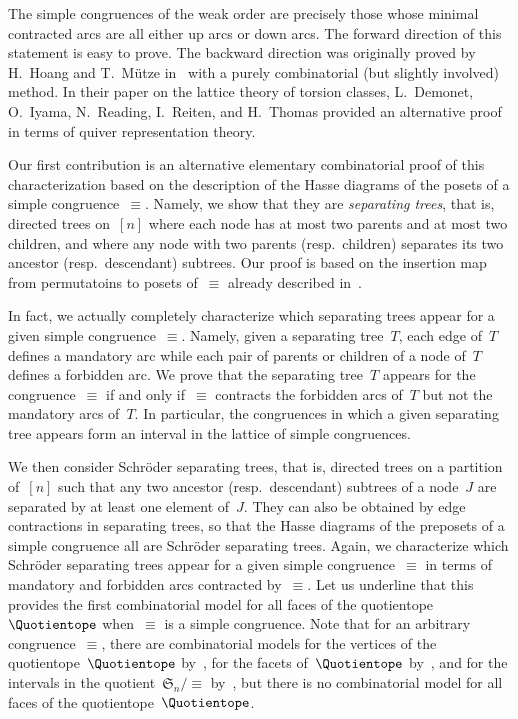 \documentclass{amsart}
\theoremstyle{definition}
\newcommand{\f}[1]{{\mathfrak{#1}}} %
\newcommand{\darkblue}{\color{darkblue}} %
\newcommand{\defn}[1]{\textsl{\darkblue #1}} %
\begin{document}
The simple congruences of the weak order are precisely those whose minimal contracted arcs are all either up arcs or down arcs.
The forward direction of this statement is easy to prove.
The backward direction was originally proved by H.~Hoang and T.~Mütze in~\cite[Sect.~4.4]{HoangMutze} with a purely combinatorial (but slightly involved) method.
In their paper on the lattice theory of torsion classes, L.~Demonet, O.~Iyama, N.~Reading, I.~Reiten, and H.~Thomas provided an alternative proof~\cite[Sect.~6.3]{DemonetIyamaReadingReitenThomas} in terms of quiver representation theory.

Our first contribution is an alternative elementary combinatorial proof of this characterization based on the description of the Hasse diagrams of the posets of a simple congruence~$\equiv$.
Namely, we show that they are \defn{separating trees}, that is, directed trees on~$[n]$ where each node has at most two parents and at most two children, and where any node with two parents (resp.~children) separates its two ancestor (resp.~descendant) subtrees.
Our proof is based on the insertion map from permutatoins to posets of~$\equiv$ already described in~\cite{Pilaud-arcDiagramAlgebra}.

In fact, we actually completely characterize which separating trees appear for a given simple congruence~$\equiv$.
Namely, given a separating tree~$T$, each edge of~$T$ defines a mandatory arc while each pair of parents or children of a node of~$T$ defines a forbidden arc.
We prove that the separating tree~$T$ appears for the congruence~$\equiv$ if and only if~$\equiv$ contracts the forbidden arcs of~$T$ but not the mandatory arcs of~$T$.
In particular, the congruences in which a given separating tree appears form an interval in the lattice of simple congruences.

We then consider Schröder separating trees, that is, directed trees on a partition of~$[n]$ such that any two ancestor (resp.~descendant) subtrees of a node~$J$ are separated by at least one element of~$J$. 
They can also be obtained by edge contractions in separating trees, so that the Hasse diagrams of the preposets of a simple congruence all are Schröder separating trees.
Again, we characterize which Schröder separating trees appear for a given simple congruence~$\equiv$ in terms of mandatory and forbidden arcs contracted by~$\equiv$.
Let us underline that this provides the first combinatorial model for all faces of the quotientope~$\Quotientope$ when~$\equiv$ is a simple congruence.
Note that for an arbitrary congruence~$\equiv$, there are combinatorial models for the vertices of the quotientope~$\Quotientope$ by~\cite{Reading-arcDiagrams}, for the facets of~$\Quotientope$ by~\cite{AlbertinPilaudRitter}, and for the intervals in the quotient~$\f{S}_n/{\equiv}$ by~\cite{AlbertinPilaud}, but there is no combinatorial model for all faces of the quotientope~$\Quotientope$.
\end{document}

